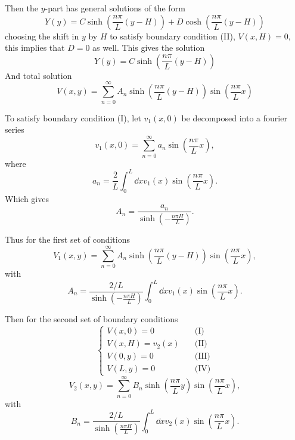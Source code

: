 \documentclass{report}
\begin{document}
  Then the $y$-part has general solutions of the form
  \begin{equation}
    Y(y) = C \sinh(\frac{n\pi}{L} (y-H)) + D \cosh(\frac{n\pi}{L} (y-H))
  \end{equation}
  choosing the shift in $y$ by $H$ to satisfy boundary condition (II), $V(x,H) = 0$, this implies that $D=0$ as well. This gives the solution
  \begin{equation}
    Y(y) = C \sinh(\frac{n\pi}{L} (y-H))
  \end{equation}
  And total solution
  \begin{equation}
    V(x,y) = \sum_{n=0}^\infty A_n \sinh(\frac{n\pi}{L} (y-H)) \sin(\frac{n\pi}{L}x)
  \end{equation}

  To satisfy boundary condition (I), let $v_1(x,0)$ be decomposed into a fourier series
  \begin{equation}
    v_1(x,0) = \sum_{n=0}^\infty a_n \sin(\frac{n\pi}{L}x),
  \end{equation}
  where
  \begin{equation}
    a_n = \frac{2}{L} \int_0^L \dd{x} v_1(x) \sin(\frac{n\pi}{L}x).
  \end{equation}
  Which gives
  \begin{equation}
    A_n = \frac{a_n}{\sinh(-\frac{n\pi H}{L})}.
  \end{equation}

  Thus for the first set of conditions
  \begin{equation}
    \boxed{V_1(x,y) = \sum_{n=0}^\infty A_{n} \sinh(\frac{n\pi}{L} (y-H)) \sin(\frac{n\pi}{L}x)},
  \end{equation}
  with
  \begin{equation}
    \boxed{A_{n} = \frac{2/L}{\sinh(-\frac{n\pi H}{L})}  \int_0^L \dd{x} v_1(x) \sin(\frac{n\pi}{L}x)}.
  \end{equation}


  Then for the second set of boundary conditions
  \begin{equation}
    \begin{cases}
      V(x,0) = 0 &\quad \text{(I)}\\
      V(x,H) = v_2(x) &\quad \text{(II)}\\
      V(0,y) = 0 &\quad \text{(III)}\\
      V(L,y) = 0 &\quad \text{(IV)}
    \end{cases}
  \end{equation}
  \begin{equation}
    \boxed{V_2(x,y) = \sum_{n=0}^\infty B_{n} \sinh(\frac{n\pi}{L} y) \sin(\frac{n\pi}{L}x)},
  \end{equation}
  with
  \begin{equation}
    \boxed{B_{n} = \frac{2/L}{\sinh(\frac{n\pi H}{L})}  \int_0^L \dd{x} v_2(x) \sin(\frac{n\pi}{L}x)}.
  \end{equation}
\end{document}
